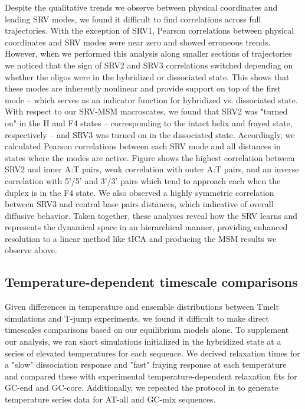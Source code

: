 \documentclass[journal=jpcbfk,manuscript=article]{achemso}
\begin{document}
Despite the qualitative trends we observe between physical coordinates and leading SRV modes, we found it difficult to find correlations across full trajectories. With the exception of SRV1, Pearson correlations between physical coordinates and SRV modes were near zero and showed erroneous trends. However, when we performed this analysis along smaller sections of trajectories we noticed that the sign of SRV2 and SRV3 correlations switched depending on whether the oligos were in the hybridized or dissociated state. This shows that these modes are inherently nonlinear and provide support on top of the first mode -- which serves as an indicator function for hybridized vs. dissociated state. With respect to our SRV-MSM macroscates, we found that SRV2 was "turned on" in the H and F4 states -- corresponding to the intact helix and frayed state, respectively -- and SRV3 was turned on in the dissociated state. Accordingly, we calculated Pearson correlations between each SRV mode and all distances in states where the modes are active. Figure \label{fig:GC-core_tracking_modes} shows the highest correlation between SRV2 and inner A:T pairs, weak correlation with outer A:T pairs, and an inverse correlation with 5'/5' and 3'/3' pairs which tend to approach each when the duplex is in the F4 state. We also observed a highly symmetric correlation between SRV3 and central base pairs distances, which indicative of overall diffusive behavior. Taken together, these analyses reveal how the SRV learns and represents the dynamical space in an hierarchical manner, providing enhanced resolution to a linear method like tICA and producing the MSM results we observe above.


\subsection{\label{sec:Results}Temperature-dependent timescale comparisons}

Given differences in temperature and ensemble distributions between Tmelt simulations and T-jump experiments, we found it difficult to make direct timescales comparisons based on our equilibrium models alone. To supplement our analysis, we ran short simulations initialized in the hybridized state at a series of elevated temperatures for each sequence. We derived relaxation times for a "slow" dissociation response and "fast" fraying response at each temperature and compared these with experimental temperature-dependent relaxation fits for GC-end and GC-core. Additionally, we repeated the protocol in \citet{Sanstead2018DirectDehybridization} to generate temperature series data for AT-all and GC-mix sequences. 
\end{document}
